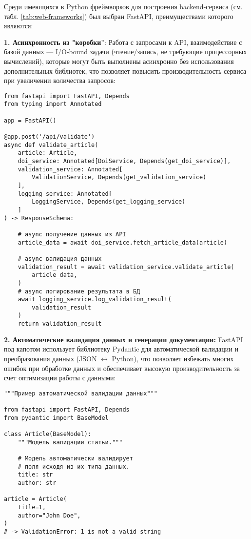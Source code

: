 Среди имеющихся в Python фреймворков для построения backend-сервиса (см. табл. \ref{tab:web-frameworks})
был выбран FastAPI, преимуществами которого являются:


\textbf{1. Асинхронность из "коробки"}:
Работа с запросами к API, взаимодействие с базой данных 
--- I/O-bound задачи (чтение/запись, не требующие процессорных вычислений), которые 
могут быть выполнены асинхронно без использования дополнительных библиотек, что позволяет 
повысить производительность сервиса при увеличении количества запросов:


\begin{verbatim}
from fastapi import FastAPI, Depends
from typing import Annotated

app = FastAPI()

@app.post('/api/validate')
async def validate_article(
    article: Article, 
    doi_service: Annotated[DoiService, Depends(get_doi_service)],
    validation_service: Annotated[
        ValidationService, Depends(get_validation_service)
    ],
    logging_service: Annotated[
        LoggingService, Depends(get_logging_service)
    ]
) -> ResponseSchema:

    # async получение данных из API
    article_data = await doi_service.fetch_article_data(article)

    # async валидация данных
    validation_result = await validation_service.validate_article(
        article_data,
    )
    # async логирование результата в БД
    await logging_service.log_validation_result(
        validation_result
    )
    return validation_result
\end{verbatim}

\textbf{2. Автоматические валидация данных и генерации документации:}
FastAPI под капотом использует библиотеку Pydantic для автоматической валидации 
и преобразования данных (JSON $\leftrightarrow$ Python), что позволяет избежать многих ошибок
при обработке данных и обеспечивает высокую производительность за счет оптимизации 
работы с данными:

\begin{verbatim}
"""Пример автоматической валидации данных"""

from fastapi import FastAPI, Depends
from pydantic import BaseModel

class Article(BaseModel):
	"""Модель валидации статьи."""

    # Модель автоматически валидирует
    # поля исходя из их типа данных.
    title: str
    author: str

article = Article(
    title=1,
    author="John Doe",
)
# -> ValidationError: 1 is not a valid string
\end{verbatim}

